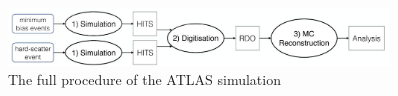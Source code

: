 \begin{figure}[!h]                
	\includegraphics[width=0.9\textwidth]{Chapter2/simulation.png}
	\centering
	\begin{center}
		\caption{The full procedure of the ATLAS simulation}
		\label{Fig:simulation}            
	\end{center}
\end{figure}